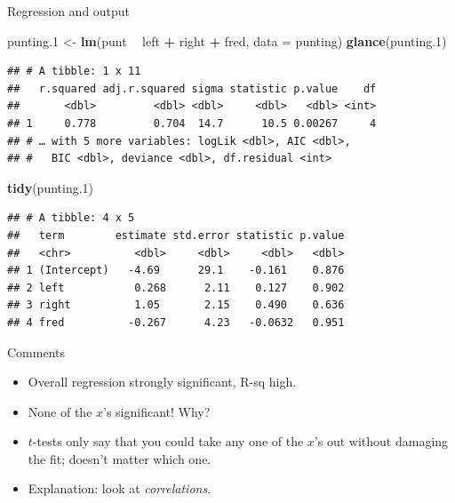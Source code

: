 \documentclass[ignorenonframetext,]{beamer}
\newenvironment{Shaded}{\begin{snugshade}}{\end{snugshade}}
\newcommand{\DataTypeTok}[1]{\textcolor[rgb]{0.13,0.29,0.53}{#1}}
\newcommand{\FloatTok}[1]{\textcolor[rgb]{0.00,0.00,0.81}{#1}}
\newcommand{\KeywordTok}[1]{\textcolor[rgb]{0.13,0.29,0.53}{\textbf{#1}}}
\newcommand{\NormalTok}[1]{#1}
\newcommand{\OperatorTok}[1]{\textcolor[rgb]{0.81,0.36,0.00}{\textbf{#1}}}
\newcommand{\StringTok}[1]{\textcolor[rgb]{0.31,0.60,0.02}{#1}}
\begin{document}
\begin{frame}[fragile]{Regression and output}
\protect\hypertarget{regression-and-output}{}

\small

\begin{Shaded}
\begin{Highlighting}[]
\NormalTok{punting}\FloatTok{.1}\NormalTok{ <-}\StringTok{ }\KeywordTok{lm}\NormalTok{(punt }\OperatorTok{~}\StringTok{ }\NormalTok{left }\OperatorTok{+}\StringTok{ }\NormalTok{right }\OperatorTok{+}\StringTok{ }\NormalTok{fred, }\DataTypeTok{data =}\NormalTok{ punting)}
\KeywordTok{glance}\NormalTok{(punting}\FloatTok{.1}\NormalTok{)}
\end{Highlighting}
\end{Shaded}

\begin{verbatim}
## # A tibble: 1 x 11
##   r.squared adj.r.squared sigma statistic p.value    df
##       <dbl>         <dbl> <dbl>     <dbl>   <dbl> <int>
## 1     0.778         0.704  14.7      10.5 0.00267     4
## # … with 5 more variables: logLik <dbl>, AIC <dbl>,
## #   BIC <dbl>, deviance <dbl>, df.residual <int>
\end{verbatim}

\begin{Shaded}
\begin{Highlighting}[]
\KeywordTok{tidy}\NormalTok{(punting}\FloatTok{.1}\NormalTok{)}
\end{Highlighting}
\end{Shaded}

\begin{verbatim}
## # A tibble: 4 x 5
##   term        estimate std.error statistic p.value
##   <chr>          <dbl>     <dbl>     <dbl>   <dbl>
## 1 (Intercept)   -4.69      29.1    -0.161    0.876
## 2 left           0.268      2.11    0.127    0.902
## 3 right          1.05       2.15    0.490    0.636
## 4 fred          -0.267      4.23   -0.0632   0.951
\end{verbatim}

\normalsize

\end{frame}

\begin{frame}{Comments}
\protect\hypertarget{comments-7}{}

\begin{itemize}
\item
  Overall regression strongly significant, R-sq high.
\item
  None of the \(x\)'s significant! Why?
\item
  \(t\)-tests only say that you could take any one of the \(x\)'s out
  without damaging the fit; doesn't matter which one.
\item
  Explanation: look at \emph{correlations}.
\end{itemize}

\end{frame}
\end{document}
